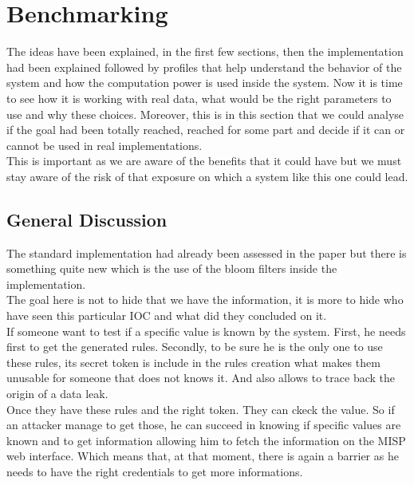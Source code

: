 \documentclass{eplmastersthesis}
\begin{document}
\section{Benchmarking}
The ideas have been explained, in the first few sections, then the implementation had been explained followed by profiles that help understand the behavior of the system and how the computation power is used inside the system. Now it is time to see how it is working with real data, what would be the right parameters to use and why these choices. Moreover, this is in this section that we could analyse if the goal had been totally reached, reached for some part and decide if it can or cannot be used in real implementations.\\
This is important as we are aware of the benefits that it could have but we must stay aware of the risk of that exposure on which a system like this one could lead.\\


\subsection{General Discussion}
The standard implementation had already been assessed in the paper  but there is something quite new which is the use of the bloom filters inside the implementation.\\
The goal here is not to hide that we have the information, it is more to hide who have seen this particular IOC and what did they concluded on it.\\
If someone want to test if a specific value is known by the system. First, he needs first to get the generated rules. Secondly, to be sure he is the only one to use these rules, its secret token is include in the rules creation what makes them unusable for someone that does not knows it. And also allows to trace back the origin of a data leak.\\
Once they have these rules and the right token. They can ckeck the value. So if an attacker manage to get those, he can succeed in knowing if specific values are known and to get information allowing him to fetch the information on the MISP web interface. Which means that, at that moment, there is again a barrier as he needs to have the right credentials to get more informations.\\
\end{document}
